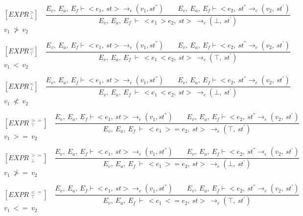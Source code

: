    	\newcommand{\exprtrans}[5][E_v, E_a,E_f]{#1\vdash \langle #2, #3 \rangle \mathrel{\to_e} (#4 , #5)}
   	
   	\[
   	[EXPR^{\ >}_{\ \bot}] \quad
   	\dfrac{E_v, \ E_a, \ E_f \vdash <e_1, \ st> \rightarrow_e (v_1, st^{''}) \qquad E_v, \ E_a, \ E_f \vdash <e_2, \ st^{''} \rightarrow_e (v_2, \ st^{'})}{E_v, \ E_a, \ E_f \ \vdash \ <e_1 \ > e_2, \ st> \ \rightarrow_e (\bot, \ st^{'})}
   	\]
	\begin{math}
   	v_1 \ \not> \ v_2
   	\end{math}   
   	
   	\[
   	[EXPR^{\ <}_{\ \top}] \quad
   	\dfrac{E_v, \ E_a, \ E_f \vdash <e_1, \ st> \rightarrow_e (v_1, st^{''}) \qquad E_v, \ E_a, \ E_f \vdash <e_2, \ st^{''} \rightarrow_e (v_2, \ st^{'})}{E_v, \ E_a, \ E_f \ \vdash \ <e_1 \ < e_2, \ st> \ \rightarrow_e (\top, \ st^{'})}
   	\]
	\begin{math}
   	v_1 \ < \ v_2
   	\end{math}   	
   	

   	\[
   	[EXPR^{\ <}_{\ \bot}] \quad
   	\dfrac{E_v, \ E_a, \ E_f \vdash <e_1, \ st> \rightarrow_e (v_1, st^{''}) \qquad E_v, \ E_a, \ E_f \vdash <e_2, \ st^{''} \rightarrow_e (v_2, \ st^{'})}{E_v, \ E_a, \ E_f \ \vdash \ <e_1 \ < e_2, \ st> \ \rightarrow_e (\bot, \ st^{'})}
   	\]
	\begin{math}
   	v_1 \ \not< \ v_2
   	\end{math}
   	
   	\[
   	[EXPR^{\ >=}_{\ \ \top}] \quad
   	\dfrac{E_v, \ E_a, \ E_f \vdash <e_1, \ st> \rightarrow_e (v_1, st^{''}) \qquad E_v, \ E_a, \ E_f \vdash <e_2, \ st^{''} \rightarrow_e (v_2, \ st^{'})}{E_v, \ E_a, \ E_f \ \vdash \ <e_1 \ >= e_2, \ st> \ \rightarrow_e (\top, \ st^{'})}
   	\]
	\begin{math}
   	v_1 \ >= \ v_2
   	\end{math}   	
   	

   	\[
   	[EXPR^{\ >=}_{\ \ \bot}] \quad
   	\dfrac{E_v, \ E_a, \ E_f \vdash <e_1, \ st> \rightarrow_e (v_1, st^{''}) \qquad E_v, \ E_a, \ E_f \vdash <e_2, \ st^{''} \rightarrow_e (v_2, \ st^{'})}{E_v, \ E_a, \ E_f \ \vdash \ <e_1 \ >= e_2, \ st> \ \rightarrow_e (\bot, \ st^{'})}
   	\]
	\begin{math}
   	v_1 \ \not>= \ v_2
   	\end{math}
   	
   	\[
   	[EXPR^{\ <=}_{\ \ \top}] \quad
   	\dfrac{E_v, \ E_a, \ E_f \vdash <e_1, \ st> \rightarrow_e (v_1, st^{''}) \qquad E_v, \ E_a, \ E_f \vdash <e_2, \ st^{''} \rightarrow_e (v_2, \ st^{'})}{E_v, \ E_a, \ E_f \ \vdash \ <e_1 \ <= e_2, \ st> \ \rightarrow_e (\top, \ st^{'})}
   	\]
	\begin{math}
   	v_1 \ <= \ v_2
   	\end{math}   	
   	

